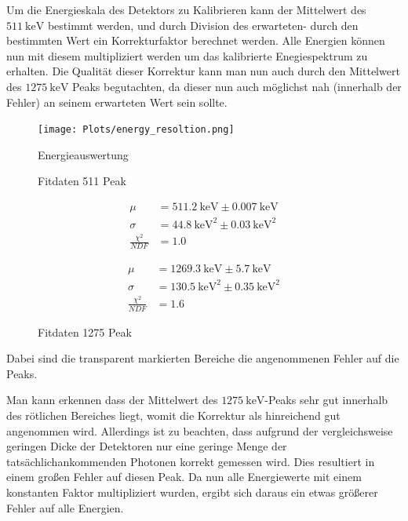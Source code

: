 \documentclass[12pt,twoside,a4paper]{scrartcl}
\begin{document}
		Um die Energieskala des Detektors zu Kalibrieren kann der Mittelwert des $\SI{511}{\kilo \electronvolt}$ bestimmt werden, und durch Division des erwarteten- durch den bestimmten Wert ein Korrekturfaktor berechnet werden. Alle Energien können nun mit diesem multipliziert werden um das kalibrierte Enegiespektrum zu erhalten.
		Die Qualität dieser Korrektur kann man nun auch durch den Mittelwert des $\SI{1275}{\kilo \electronvolt}$ Peaks begutachten, da dieser nun auch möglichst nah (innerhalb der Fehler) an seinem erwarteten Wert sein sollte.



		\begin{figure}[H]
			\centering
			\texttt{[image: Plots/energy\_resoltion.png]}
			\caption{Energieauswertung}
		\end{figure}

		\begin{figure}[H]
			\begin{minipage}{0.49 \textwidth}
				\caption{Fitdaten 511 Peak}

				\begin{align*}
					\mu &= \SI{511.2}{\kilo \electronvolt} \pm \SI{0.007}{\kilo \electronvolt} \\
					\sigma &= \SI{44.8}{\kilo \electronvolt \squared} \pm \SI{0.03}{\kilo \electronvolt \squared} \\
					\frac{\chi^2}{NDF} &= 1.0
				\end{align*}

			\end{minipage}
			\begin{minipage}{0.49 \textwidth}
				\caption{Fitdaten 1275 Peak}

				\begin{align*}
					\mu &= \SI{1269.3}{\kilo \electronvolt} \pm \SI{5.7}{\kilo \electronvolt} \\
					\sigma &= \SI{130.5}{\kilo \electronvolt \squared} \pm \SI{0.35}{\kilo \electronvolt \squared} \\
					\frac{\chi^2}{NDF} &= 1.6
				\end{align*}

			\end{minipage}
		\end{figure}


		Dabei sind die transparent markierten Bereiche die angenommenen Fehler auf die Peaks.

		Man kann erkennen dass der Mittelwert des $\SI{1275}{\kilo \electronvolt}$-Peaks sehr gut innerhalb des rötlichen Bereiches liegt, womit die Korrektur als hinreichend gut angenommen wird. Allerdings ist zu beachten, dass aufgrund der vergleichsweise geringen Dicke der Detektoren nur eine geringe Menge der tatsächlichankommenden Photonen korrekt gemessen wird. Dies resultiert in einem großen Fehler auf diesen Peak. Da nun alle Energiewerte mit einem konstanten Faktor multipliziert wurden, ergibt sich daraus ein etwas größerer Fehler auf alle Energien.
\end{document}
